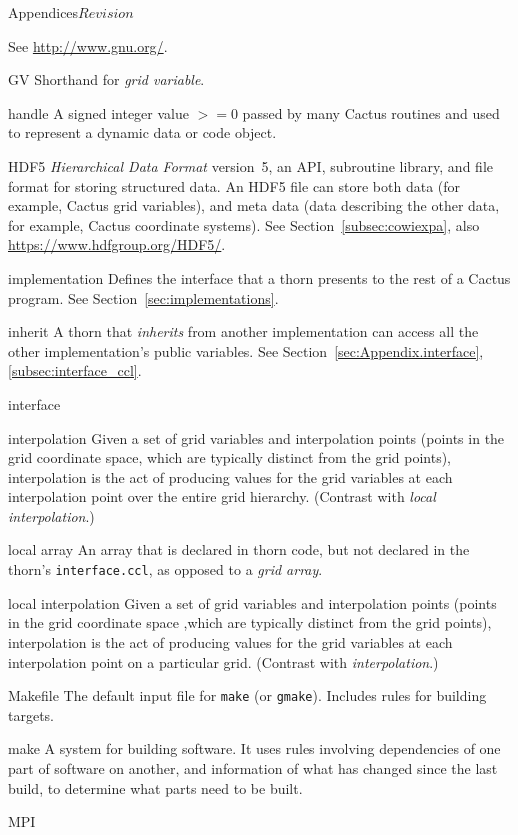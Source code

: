 \begin{cactuspart}{Appendices}{}{$Revision$}
\begin{Lentry}
  See \url{http://www.gnu.org/}.
\item[GV]
  Shorthand for \textit{grid variable}.
\item[handle]
  A signed integer value $>= 0$ passed by many Cactus routines and
  used to represent a dynamic data or code object.
\item[HDF5]
  \textit{Hierarchical Data Format} version~5, an API, subroutine library, and
  file format for storing structured data.  An HDF5 file can
  store both data (for example, Cactus grid variables), and meta data
  (data describing the other data, for example, Cactus coordinate
  systems).
  See Section~\ref{subsec:cowiexpa}, also
  \url{https://www.hdfgroup.org/HDF5/}.
\item[implementation]
  Defines the interface that a thorn presents to the rest of a Cactus program.
  See Section~\ref{sec:implementations}.
\item[inherit] A thorn that \textit{inherits} from another implementation
  can access all the other implementation's public variables.
  See Section~\ref{sec:Appendix.interface}, \ref{subsec:interface_ccl}.
\item[interface]
\item[interpolation]
  Given a set of grid variables and interpolation points (points in the
  grid coordinate space, which are typically distinct from the grid points),
  interpolation is the act of producing values for the grid variables 
  at each interpolation point over the entire grid hierarchy.  
  (Contrast with \textit{local interpolation}.)
\item[local array]
  An array that is declared in thorn code, but not declared in the thorn's
  \verb|interface.ccl|, as opposed to a \textit{grid array}.
\item[local interpolation]
  Given a set of grid variables and interpolation points (points in the
  grid coordinate space ,which are typically distinct from the grid points),
  interpolation is the act of producing values for the grid variables
  at each interpolation point on a particular grid.  
  (Contrast with \textit{interpolation}.)
\item[Makefile]
  The default input file for \texttt{make} (or \texttt{gmake}).  Includes
  rules for building targets.
\item[make] A system for building software.  It uses rules involving
  dependencies of one part of software on another, and information of what
  has changed since the last build, to determine what parts need to be
  built.
\item[MPI]

\end{Lentry}
\end{cactuspart}
